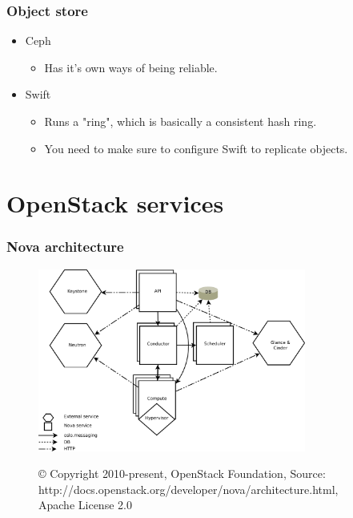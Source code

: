 \documentclass[aspectratio=43]{beamer}
\begin{document}
\begin{frame}
    \frametitle{Object store}
    \begin{center}
        \begin{itemize}
            \item Ceph
            \begin{itemize}
                \item Has it's own ways of being reliable.
            \end{itemize}
            \pause
            \item Swift
            \begin{itemize}
                \item Runs a "ring", which is basically a consistent hash ring.
                \item You need to make sure to configure Swift to replicate objects.
            \end{itemize}
        \end{itemize}
    \end{center}
\end{frame}

\section{OpenStack services}

\begin{frame}
    \frametitle{Nova architecture}
    \begin{figure}
        \includegraphics[height=6cm]{images/nova-architecture.png}

        \tiny{© Copyright 2010-present, OpenStack Foundation, Source: http://docs.openstack.org/developer/nova/architecture.html, Apache License 2.0}
    \end{figure}
\end{frame}
\end{document}
